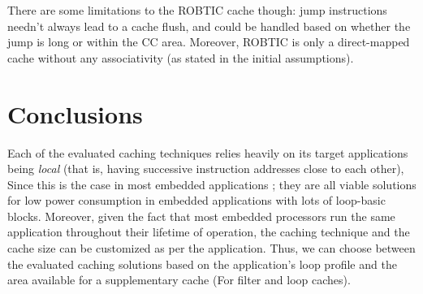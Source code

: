 \documentclass[conference]{IEEEtran}
\begin{document}
There are some limitations to the ROBTIC cache though: jump instructions needn't always lead to a cache flush, and could be handled based on whether the jump is long or within the CC area. Moreover, ROBTIC is only a direct-mapped cache without any associativity (as stated in the initial assumptions).
	

\section{Conclusions}

Each of the evaluated caching techniques relies heavily on its target applications being \textit{local} (that is, having successive instruction addresses close to each other), Since this is the case in most embedded applications \cite{robtic}; they are all viable solutions for low power consumption in embedded applications with lots of loop-basic blocks. Moreover, given the fact that most embedded processors run the same application throughout their lifetime of operation, the caching technique and the cache size can be customized as per the application. Thus, we can choose between the evaluated caching solutions based on the application's loop profile and the area available for a supplementary cache (For filter and loop caches).
\end{document}
